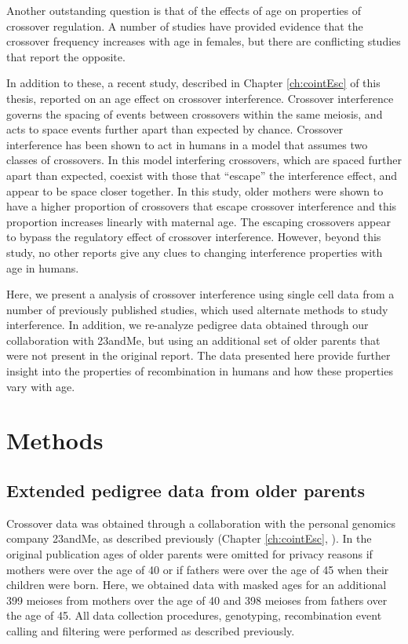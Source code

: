 Another outstanding question is that of the effects of age on properties of crossover regulation.
A number of studies have provided evidence that the crossover frequency increases with age in females\cite{Kong2004,Martin2015}, but there are conflicting studies that report the opposite\cite{Bleazard2013,Hussin2011}.

In addition to these, a recent study, described in Chapter \ref{ch:cointEsc} of this thesis, reported on an age effect on crossover interference.
Crossover interference governs the spacing of events between crossovers within the same meiosis, and acts to space events further apart than expected by chance.
Crossover interference has been shown to act in humans\cite{Broman2000,Housworth2003} in a model that assumes two classes of crossovers.
In this model interfering crossovers, which are spaced further apart than expected, coexist with those that ``escape'' the interference effect, and appear to be space closer together.
In this study, older mothers were shown to have a higher proportion of crossovers that escape crossover interference and this proportion increases linearly with maternal age\cite{Campbell2015}.
The escaping crossovers appear to bypass the regulatory effect of crossover interference.
However, beyond this study, no other reports give any clues to changing interference properties with age in humans.

Here, we present a analysis of crossover interference using single cell data from a number of previously published studies, which used alternate methods to study interference.
In addition, we re-analyze pedigree data obtained through our collaboration with 23andMe, but using an additional set of older parents that were not present in the original report.
The data presented here provide further insight into the properties of recombination in humans and how these properties vary with age.



\section{Methods}

\subsection{Extended pedigree data from older parents}
Crossover data was obtained through a collaboration with the personal genomics company 23andMe, as described previously (Chapter \ref{ch:cointEsc}, \citet{Campbell2015}).
In the original publication ages of older parents were omitted for privacy reasons if mothers were over the age of 40 or if fathers were over the age of 45 when their children were born.
Here, we obtained data with masked ages for an additional 399 meioses from mothers over the age of 40 and 398 meioses from fathers over the age of 45.
All data collection procedures, genotyping, recombination event calling and filtering were performed as described previously.

